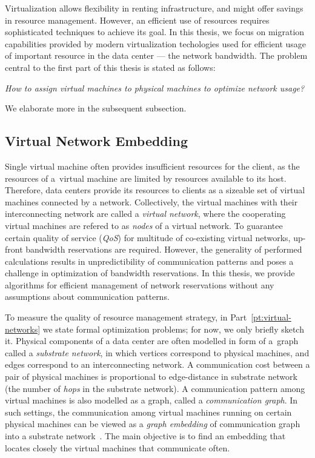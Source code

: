 Virtualization allows flexibility in renting infrastructure, and might offer savings in resource management.
However, an efficient use of resources requires sophisticated techniques to achieve its goal.
In this thesis, we focus on migration capabilities provided by modern virtualization techologies used for efficient usage of important resource in the data center --- the network bandwidth.
The problem central to the first part of this thesis is stated as follows:

\begin{center}
  \emph{How to assign virtual machines to physical machines to optimize network
  usage?}
\end{center}
We elaborate more in the subsequent subsection.

\subsection{Virtual Network Embedding}

Single virtual machine often provides insufficient resources for the client, as the resources of a~virtual machine are limited by resources available to its host.
Therefore, data centers provide its resources to clients as a sizeable set of virtual machines connected by a network.
Collectively, the virtual machines with their interconnecting network are called a \emph{virtual network}, where the cooperating virtual machines are refered to as \emph{nodes} of a virtual network.
To guarantee certain quality of service (\emph{QoS}) for multitude of co-existing virtual networks, up-front bandwidth reservations are required.
However, the generality of performed calculations results in unpredictibility of communication patterns and poses a challenge in optimization of bandwidth reservations.
In this thesis, we provide algorithms for efficient management of network reservations without any assumptions about communication patterns.

To measure the quality of resource management strategy, in Part~\ref{pt:virtual-networks} we state formal optimization problems; for now, we only briefly sketch it.
Physical components of a data center are often modelled in form of a~graph called a \emph{substrate network}, in which vertices correspond to physical machines, and edges correspond to an interconnecting network.
A communication cost between a pair of physical machines is proportional to edge-distance in substrate network (the number of \emph{hops} in the substrate network).
A communication pattern among virtual machines is also modelled as a graph, called a \emph{communication graph}.
In such settings, the communication among virtual machines running on certain physical machines can be viewed as a \emph{graph embedding} of communication graph into a substrate network~\cite{Goyal2008,gupta2001provisioning}.
The main objective is to find an embedding that locates closely the virtual machines that communicate often.


